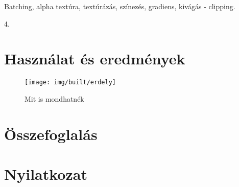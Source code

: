 \documentclass[12pt]{report}
\theoremstyle{definition}
\begin{document}
  \begin{description}[noitemsep]
    \item[Kulcsszavak] Batching, alpha textúra, textúrázás, színezés,
    gradiens, kivágás - clipping.
    \item[Becsült oldalszám] 4.
  \end{description}


    \chapter{Használat és eredmények}

  \begin{figure}[!htb]
    \centering
    \texttt{[image: img/built/erdely]}
    \caption{\label{erdely} Mit is mondhatnék}
  \end{figure}


    \chapter{Összefoglalás}



    {}
    


    \chapter*{Nyilatkozat}
\end{document}
